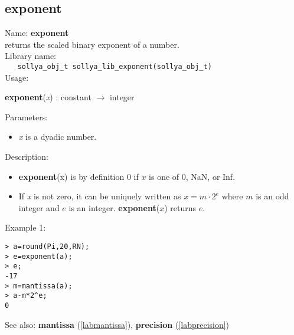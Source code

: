 \subsection{exponent}
\label{labexponent}
\noindent Name: \textbf{exponent}\\
\phantom{aaa}returns the scaled binary exponent of a number.\\[0.2cm]
\noindent Library name:\\
\verb|   sollya_obj_t sollya_lib_exponent(sollya_obj_t)|\\[0.2cm]
\noindent Usage: 
\begin{center}
\textbf{exponent}(\emph{x}) : \textsf{constant} $\rightarrow$ \textsf{integer}\\
\end{center}
Parameters: 
\begin{itemize}
\item \emph{x} is a dyadic number.
\end{itemize}
\noindent Description: \begin{itemize}

\item \textbf{exponent}(x) is by definition 0 if $x$ is one of 0, NaN, or Inf.

\item If \emph{x} is not zero, it can be uniquely written as $x = m \cdot 2^e$ where
   $m$ is an odd integer and $e$ is an integer. \textbf{exponent}($x$) returns $e$. 
\end{itemize}
\noindent Example 1: 
\begin{center}\begin{minipage}{15cm}\begin{Verbatim}[frame=single,commandchars=\\\|\~]
> a=round(Pi,20,RN);
> e=exponent(a);
> e;
-17
> m=mantissa(a);
> a-m*2^e;
0
\end{Verbatim}
\end{minipage}\end{center}
See also: \textbf{mantissa} (\ref{labmantissa}), \textbf{precision} (\ref{labprecision})

